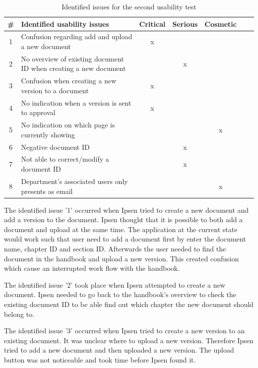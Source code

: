 \begin{table}[H]
	\begin{center}
	\begin{tabular}{| c | m{21em} | c | c | c | c | c |}
		\hline
		\# & \textbf{Identified usability issues} & Critical  & Serious & Cosmetic \\
		\hline
		 1 & Confusion regarding add and upload a new document   & x &  &  \\
		\hline
		 2 & No overview of existing document ID when creating a new document &  & x & \\
		\hline
		 3 & Confusion when creating a new version to a document & x & &  \\
		\hline
		4 & No indication when a version is sent to approval & x & & \\
		\hline
		5 & No indication on which page is currently showing &  &  & x \\
		\hline
		6 & Negative document ID &  & x & \\
		\hline
		7 & Not able to correct/modify a document ID & & x &  \\
		\hline
		8 & Department's associated users only presents as email &  &  & x \\
		\hline
	\end{tabular}
	\end{center}
	\caption{Identified issues for the second usability test}\label{tab:utest2}
\end{table}

The identified issue '1' occurred when Ipsen tried to create a new document and add a version to the document.
Ipsen thought that it is possible to both add a document and upload at the same time.
The application at the current state would work such that user need to add a document first by enter the document name, chapter ID and section ID. Afterwards the user needed to find the document in the handbook and upload a new version.
This created confusion which cause an interrupted work flow with the handbook.

The identified issue '2' took place when Ipsen attempted to create a new document.
Ipsen needed to go back to the handbook's overview to check the existing document ID to be able find out which chapter the new document should belong to.

The identified issue '3' occurred when Ipsen tried to create a new version to an existing document.
It was unclear where to upload a new version.
Therefore Ipsen tried to add a new document and then uploaded a new version.
The upload button was not noticeable and took time before Ipsen found it.

